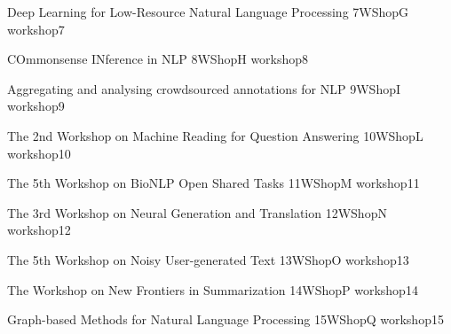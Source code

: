 \begin{wsschedule}
 {Deep Learning for Low-Resource Natural Language Processing}
 {7}{WShopG}
 {workshop7}
 {\WShopLocG}
 
\end{wsschedule}

\begin{wsschedule}
 {COmmonsense INference in NLP}
 {8}{WShopH}
 {workshop8}
 {\WShopLocH}
 
\end{wsschedule}

\begin{wsschedule}
 {Aggregating and analysing crowdsourced annotations for NLP}
 {9}{WShopI}
 {workshop9}
 {\WShopLocI}
 
\end{wsschedule}



\begin{wsschedule}
 {The 2nd Workshop on Machine Reading for Question Answering}
 {10}{WShopL}
 {workshop10}
 {\WShopLocL}
 
\end{wsschedule}
 
\begin{wsschedule}
 {The 5th Workshop on BioNLP Open Shared Tasks}
 {11}{WShopM}
 {workshop11}
 {\WShopLocM}
 
\end{wsschedule}

\begin{wsschedule}
 {The 3rd Workshop on Neural Generation and Translation}
 {12}{WShopN}
 {workshop12}
 {\WShopLocN}
 
\end{wsschedule}

\begin{wsschedule}
 {The 5th Workshop on Noisy User-generated Text}
 {13}{WShopO}
 {workshop13}
 {\WShopLocO}
 
\end{wsschedule}

\begin{wsschedule}
 {The Workshop on New Frontiers in Summarization}
 {14}{WShopP}
 {workshop14}
 {\WShopLocP}
 
\end{wsschedule}

\begin{wsschedule}
 {Graph-based Methods for Natural Language Processing}
 {15}{WShopQ}
 {workshop15}
 {\WShopLocQ}
 
\end{wsschedule}

